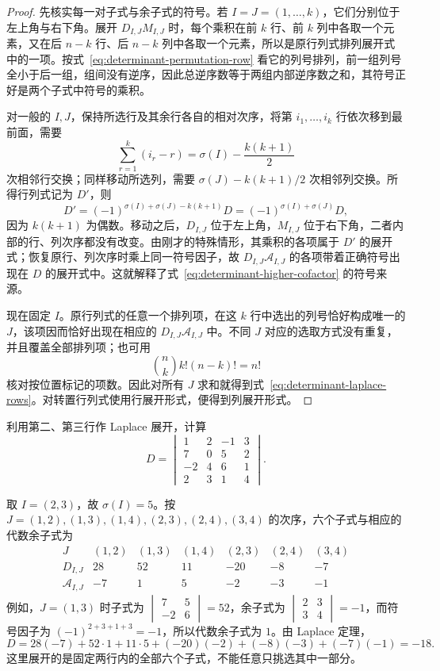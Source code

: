\begin{proof}
先核实每一对子式与余子式的符号。若 $I=J=(1,\ldots,k)$，它们分别位于左上角与右下角。展开 $D_{I,J}M_{I,J}$ 时，每个乘积在前 $k$ 行、前 $k$ 列中各取一个元素，又在后 $n-k$ 行、后 $n-k$ 列中各取一个元素，所以是原行列式排列展开式中的一项。按式~\eqref{eq:determinant-permutation-row} 看它的列号排列，前一组列号全小于后一组，组间没有逆序，因此总逆序数等于两组内部逆序数之和，其符号正好是两个子式中符号的乘积。

对一般的 $I,J$，保持所选行及其余行各自的相对次序，将第 $i_1,\ldots,i_k$ 行依次移到最前面，需要
\[
    \sum_{r=1}^{k}(i_r-r)=\sigma(I)-\frac{k(k+1)}{2}
\]
次相邻行交换；同样移动所选列，需要 $\sigma(J)-k(k+1)/2$ 次相邻列交换。所得行列式记为 $D'$，则
\[
    D'=(-1)^{\sigma(I)+\sigma(J)-k(k+1)}D
       =(-1)^{\sigma(I)+\sigma(J)}D,
\]
因为 $k(k+1)$ 为偶数。移动之后，$D_{I,J}$ 位于左上角，$M_{I,J}$ 位于右下角，二者内部的行、列次序都没有改变。由刚才的特殊情形，其乘积的各项属于 $D'$ 的展开式；恢复原行、列次序时乘上同一符号因子，故 $D_{I,J}\mathcal A_{I,J}$ 的各项带着正确符号出现在 $D$ 的展开式中。这就解释了式~\eqref{eq:determinant-higher-cofactor} 的符号来源。

现在固定 $I$。原行列式的任意一个排列项，在这 $k$ 行中选出的列号恰好构成唯一的 $J$，该项因而恰好出现在相应的 $D_{I,J}\mathcal A_{I,J}$ 中。不同 $J$ 对应的选取方式没有重复，并且覆盖全部排列项；也可用
\[
    \binom{n}{k}k!(n-k)!=n!
\]
核对按位置标记的项数。因此对所有 $J$ 求和就得到式~\eqref{eq:determinant-laplace-rows}。对转置行列式使用行展开形式，便得到列展开形式。
\end{proof}

\begin{example}
利用第二、第三行作 Laplace 展开，计算
\[
    D=\begin{vmatrix}
        1&2&-1&3\\
        7&0&5&2\\
        -2&4&6&1\\
        2&3&1&4
    \end{vmatrix}.
\]
\end{example}
\begin{solve}
取 $I=(2,3)$，故 $\sigma(I)=5$。按 $J=(1,2),(1,3),(1,4),(2,3),(2,4),(3,4)$ 的次序，六个子式与相应的代数余子式为
\[
    \begin{array}{c|rrrrrr}
        J&(1,2)&(1,3)&(1,4)&(2,3)&(2,4)&(3,4)\\ \hline
        D_{I,J}&28&52&11&-20&-8&-7\\
        \mathcal A_{I,J}&-7&1&5&-2&-3&-1
    \end{array}
\]
例如，$J=(1,3)$ 时子式为 $\begin{vmatrix}7&5\\-2&6\end{vmatrix}=52$，余子式为 $\begin{vmatrix}2&3\\3&4\end{vmatrix}=-1$，而符号因子为 $(-1)^{2+3+1+3}=-1$，所以代数余子式为 $1$。由 Laplace 定理，
\[
    D=28(-7)+52\cdot1+11\cdot5+(-20)(-2)+(-8)(-3)+(-7)(-1)=-18.
\]
这里展开的是固定两行内的全部六个子式，不能任意只挑选其中一部分。
\end{solve}

